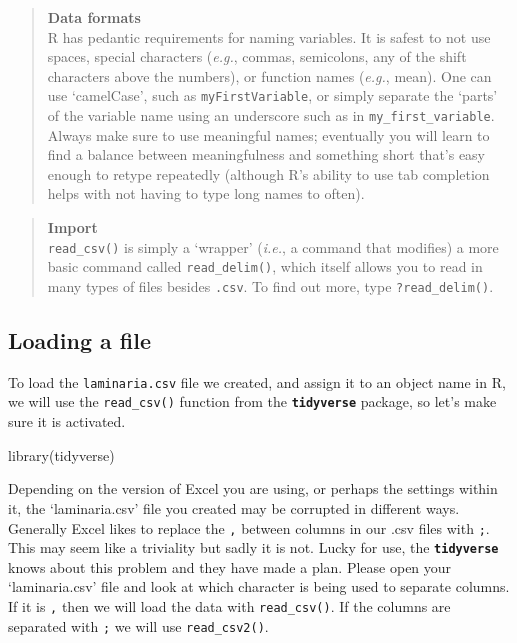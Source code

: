 \documentclass[
]{book}
\newenvironment{Shaded}{\begin{snugshade}}{\end{snugshade}}
\newcommand{\FunctionTok}[1]{\textcolor[rgb]{0.00,0.00,0.00}{#1}}
\newcommand{\NormalTok}[1]{#1}
\begin{document}
\begin{quote}
\textbf{Data formats}\\
R has pedantic requirements for naming variables. It is safest to not use spaces, special characters (\emph{e.g.}, commas, semicolons, any of the shift characters above the numbers), or function names (\emph{e.g.}, mean). One can use `camelCase', such as \texttt{myFirstVariable}, or simply separate the `parts' of the variable name using an underscore such as in \texttt{my\_first\_variable}. Always make sure to use meaningful names; eventually you will learn to find a balance between meaningfulness and something short that's easy enough to retype repeatedly (although R's ability to use tab completion helps with not having to type long names to often).
\end{quote}

\begin{quote}
\textbf{Import}\\
\texttt{read\_csv()} is simply a `wrapper' (\emph{i.e.}, a command that modifies) a more basic command called \texttt{read\_delim()}, which itself allows you to read in many types of files besides \texttt{.csv}. To find out more, type \texttt{?read\_delim()}.
\end{quote}

\hypertarget{loading-a-file}{%
\subsection{Loading a file}\label{loading-a-file}}

To load the \texttt{laminaria.csv} file we created, and assign it to an object name in R, we will use the \texttt{read\_csv()} function from the \textbf{\texttt{tidyverse}} package, so let's make sure it is activated.

\begin{Shaded}
\begin{Highlighting}[]
\FunctionTok{library}\NormalTok{(tidyverse)}
\end{Highlighting}
\end{Shaded}

Depending on the version of Excel you are using, or perhaps the settings within it, the `laminaria.csv' file you created may be corrupted in different ways. Generally Excel likes to replace the \texttt{,} between columns in our .csv files with \texttt{;}. This may seem like a triviality but sadly it is not. Lucky for use, the \textbf{\texttt{tidyverse}} knows about this problem and they have made a plan. Please open your `laminaria.csv' file and look at which character is being used to separate columns. If it is \texttt{,} then we will load the data with \texttt{read\_csv()}. If the columns are separated with \texttt{;} we will use \texttt{read\_csv2()}.
\end{document}
